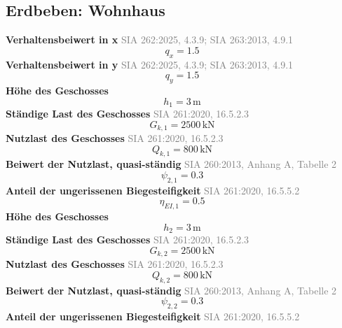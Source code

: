 \documentclass[11pt,a4paper]{article}
\newcommand{\normref}[1]{{\small\textcolor{gray}{#1}}}
\begin{document}
\subsection{Erdbeben: Wohnhaus}
\noindent\textbf{Verhaltensbeiwert in x} \hfill \normref{SIA 262:2025, 4.3.9; SIA 263:2013, 4.9.1}
\begin{equation*}
q_x = 1.5
\end{equation*}
\noindent\textbf{Verhaltensbeiwert in y} \hfill \normref{SIA 262:2025, 4.3.9; SIA 263:2013, 4.9.1}
\begin{equation*}
q_y = 1.5
\end{equation*}
\noindent\textbf{Höhe des Geschosses}
\begin{equation*}
h_{1} = 3\,\mathrm{m}
\end{equation*}
\noindent\textbf{Ständige Last des Geschosses} \hfill \normref{SIA 261:2020, 16.5.2.3}
\begin{equation*}
G_{k,1} = 2500\,\mathrm{kN}
\end{equation*}
\noindent\textbf{Nutzlast des Geschosses} \hfill \normref{SIA 261:2020, 16.5.2.3}
\begin{equation*}
Q_{k,1} = 800\,\mathrm{kN}
\end{equation*}
\noindent\textbf{Beiwert der Nutzlast, quasi-ständig} \hfill \normref{SIA 260:2013, Anhang A, Tabelle 2}
\begin{equation*}
\psi_{2,1} = 0.3
\end{equation*}
\noindent\textbf{Anteil der ungerissenen Biegesteifigkeit} \hfill \normref{SIA 261:2020, 16.5.5.2}
\begin{equation*}
\eta_{EI,1} = 0.5
\end{equation*}
\noindent\textbf{Höhe des Geschosses}
\begin{equation*}
h_{2} = 3\,\mathrm{m}
\end{equation*}
\noindent\textbf{Ständige Last des Geschosses} \hfill \normref{SIA 261:2020, 16.5.2.3}
\begin{equation*}
G_{k,2} = 2500\,\mathrm{kN}
\end{equation*}
\noindent\textbf{Nutzlast des Geschosses} \hfill \normref{SIA 261:2020, 16.5.2.3}
\begin{equation*}
Q_{k,2} = 800\,\mathrm{kN}
\end{equation*}
\noindent\textbf{Beiwert der Nutzlast, quasi-ständig} \hfill \normref{SIA 260:2013, Anhang A, Tabelle 2}
\begin{equation*}
\psi_{2,2} = 0.3
\end{equation*}
\noindent\textbf{Anteil der ungerissenen Biegesteifigkeit} \hfill \normref{SIA 261:2020, 16.5.5.2}
\end{document}
